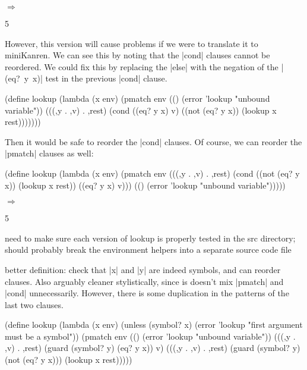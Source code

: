 \noindent{} $\Rightarrow$
\begin{schemeresponsebox}5\end{schemeresponsebox}


However, this version will cause problems if we were to translate it
to miniKanren.  We can see this by noting that the \scheme|cond|
clauses cannot be reordered.  We could fix this by replacing the
\scheme|else| with the negation of the \mbox{\scheme|(eq? y x)|} test
in the previous \scheme|cond| clause.

\begin{schemedisplay}
(define lookup
  (lambda (x env)
    (pmatch env
      (() (error 'lookup "unbound variable"))
      (((,y . ,v) . ,rest)
       (cond
         ((eq? y x) v)
         ((not (eq? y x)) (lookup x rest)))))))
\end{schemedisplay}

Then it would be safe to reorder the \scheme|cond| clauses.  Of course, we can
reorder the \scheme|pmatch| clauses as well:

\begin{schemedisplay}
(define lookup
  (lambda (x env)
    (pmatch env
      (((,y . ,v) . ,rest)
       (cond
         ((not (eq? y x)) (lookup x rest))
         ((eq? y x) v)))
      (() (error 'lookup "unbound variable")))))
\end{schemedisplay}

\noindent{} $\Rightarrow$
\begin{schemeresponsebox}5\end{schemeresponsebox}

need to make sure each version of lookup is properly tested in the src directory;
should probably break the environment helpers into a separate source code file


better definition: check that \scheme|x| and \scheme|y| are indeed
symbols, and can reorder clauses.  Also arguably cleaner
stylistically, since is doesn't mix \scheme|pmatch| and \scheme|cond|
unnecessarily.  However, there is some duplication in the patterns of
the last two clauses.

\begin{schemedisplay}
(define lookup
  (lambda (x env)
    (unless (symbol? x)
      (error 'lookup "first argument must be a symbol"))
    (pmatch env
      (() (error 'lookup "unbound variable"))
      (((,y . ,v) . ,rest) (guard (symbol? y) (eq? y x))
       v)
      (((,y . ,v) . ,rest) (guard (symbol? y) (not (eq? y x)))
       (lookup x rest)))))
\end{schemedisplay}

